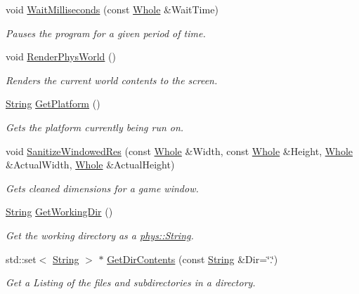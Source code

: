 \begin{DoxyCompactItemize}
void \hyperlink{namespacephys_1_1crossplatform_ab525e3abf3625b83954e2d55a5869d18}{WaitMilliseconds} (const \hyperlink{namespacephys_a460f6bc24c8dd347b05e0366ae34f34a}{Whole} \&WaitTime)
\begin{DoxyCompactList}\small\item\em Pauses the program for a given period of time. \item\end{DoxyCompactList}\item 
void \hyperlink{namespacephys_1_1crossplatform_a7c0ef3957423db484714c3356603c09d}{RenderPhysWorld} ()
\begin{DoxyCompactList}\small\item\em Renders the current world contents to the screen. \item\end{DoxyCompactList}\item 
\hyperlink{namespacephys_aa03900411993de7fbfec4789bc1d392e}{String} \hyperlink{namespacephys_1_1crossplatform_af34fd6dc13360417a87c579744932dce}{GetPlatform} ()
\begin{DoxyCompactList}\small\item\em Gets the platform currently being run on. \item\end{DoxyCompactList}\item 
void \hyperlink{namespacephys_1_1crossplatform_ab8bf982a60b008f32c91c90354efc162}{SanitizeWindowedRes} (const \hyperlink{namespacephys_a460f6bc24c8dd347b05e0366ae34f34a}{Whole} \&Width, const \hyperlink{namespacephys_a460f6bc24c8dd347b05e0366ae34f34a}{Whole} \&Height, \hyperlink{namespacephys_a460f6bc24c8dd347b05e0366ae34f34a}{Whole} \&ActualWidth, \hyperlink{namespacephys_a460f6bc24c8dd347b05e0366ae34f34a}{Whole} \&ActualHeight)
\begin{DoxyCompactList}\small\item\em Gets cleaned dimensions for a game window. \item\end{DoxyCompactList}\item 
\hyperlink{namespacephys_aa03900411993de7fbfec4789bc1d392e}{String} \hyperlink{namespacephys_1_1crossplatform_aa13f8bf79ac9313095e9a1b935ef3a10}{GetWorkingDir} ()
\begin{DoxyCompactList}\small\item\em Get the working directory as a \hyperlink{namespacephys_aa03900411993de7fbfec4789bc1d392e}{phys::String}. \item\end{DoxyCompactList}\item 
std::set$<$ \hyperlink{namespacephys_aa03900411993de7fbfec4789bc1d392e}{String} $>$ $\ast$ \hyperlink{namespacephys_1_1crossplatform_ae9467e352901b33f7483fe8cc974b578}{GetDirContents} (const \hyperlink{namespacephys_aa03900411993de7fbfec4789bc1d392e}{String} \&Dir=\char`\"{}.\char`\"{})
\begin{DoxyCompactList}\small\item\em Get a Listing of the files and subdirectories in a directory. \item\end{DoxyCompactList}\end{DoxyCompactItemize}


